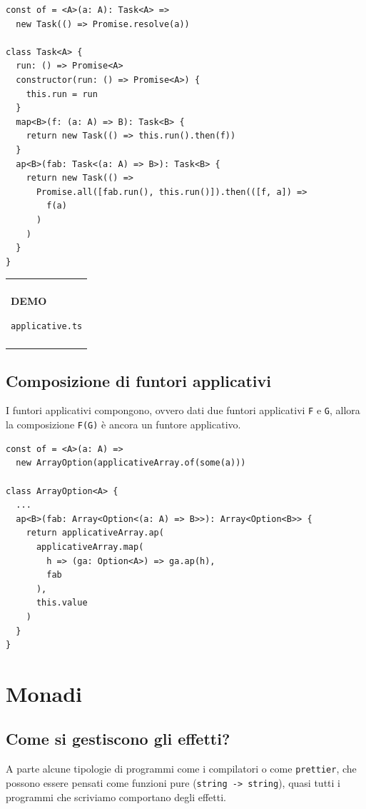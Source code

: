 \documentclass[12pt]{article}
\newenvironment{boxed}
    {\begin{center}
    \begin{tabular}{|p{0.9\textwidth}|}
    \hline\\
    }
    {
    \\\\\hline
    \end{tabular}
    \end{center}
    }
\begin{document}
\begin{verbatim}
const of = <A>(a: A): Task<A> =>
  new Task(() => Promise.resolve(a))

class Task<A> {
  run: () => Promise<A>
  constructor(run: () => Promise<A>) {
    this.run = run
  }
  map<B>(f: (a: A) => B): Task<B> {
    return new Task(() => this.run().then(f))
  }
  ap<B>(fab: Task<(a: A) => B>): Task<B> {
    return new Task(() =>
      Promise.all([fab.run(), this.run()]).then(([f, a]) =>
        f(a)
      )
    )
  }
}
\end{verbatim}

\begin{boxed}
\begin{center}
\textbf{DEMO}

\texttt{applicative.ts}
\end{center}
\end{boxed}

\subsection{Composizione di funtori applicativi}

I funtori applicativi compongono, ovvero dati due funtori applicativi \texttt{F} e \texttt{G},
allora la composizione \texttt{F(G)} è ancora un funtore applicativo.

\begin{verbatim}
const of = <A>(a: A) =>
  new ArrayOption(applicativeArray.of(some(a)))

class ArrayOption<A> {
  ...
  ap<B>(fab: Array<Option<(a: A) => B>>): Array<Option<B>> {
    return applicativeArray.ap(
      applicativeArray.map(
        h => (ga: Option<A>) => ga.ap(h),
        fab
      ),
      this.value
    )
  }
}
\end{verbatim}

\section{Monadi}

\subsection{Come si gestiscono gli effetti?}

A parte alcune tipologie di programmi come i compilatori o come \texttt{prettier}, che possono essere pensati come funzioni pure (\texttt{string -> string}),
quasi tutti i programmi che scriviamo comportano degli effetti.
\end{document}
